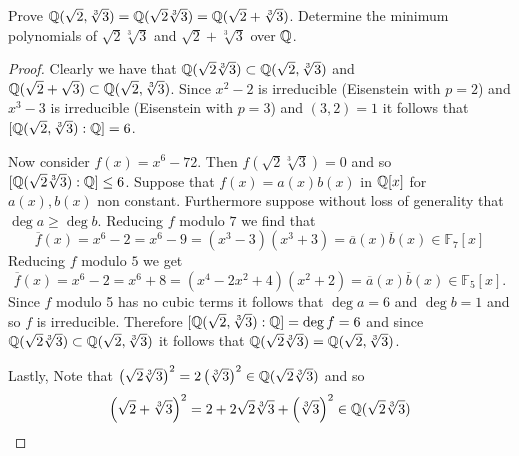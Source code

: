     \begin{ex}{21.28}
        Prove $\mathbb{Q}(\sqrt{2},\sqrt[3]{3})=\mathbb{Q}(\sqrt{2}\sqrt[3]{3})=\mathbb{Q}(\sqrt{2}+\sqrt[3]{3})$.
        Determine the minimum polynomials of $\sqrt{2}\sqrt[3]{3}$ and $\sqrt{2}+\sqrt[3]{3}$ over $\mathbb{Q}$.
    \end{ex}
    \begin{proof}
        Clearly we have that $\mathbb{Q}(\sqrt{2}\sqrt[3]{3})\subset\mathbb{Q}(\sqrt{2},\sqrt[3]{3})$ 
        and $\mathbb{Q}(\sqrt{2}+\sqrt{3})\subset\mathbb{Q}(\sqrt{2},\sqrt[3]{3})$. 
        Since $x^2-2$ is irreducible (Eisenstein with $p=2$) and $x^3-3$ is irreducible (Eisenstein with $p=3$) and $(3,2)=1$ it follows that $[\mathbb{Q}(\sqrt{2},\sqrt[3]{3}):\mathbb{Q}]=6$.

        Now consider $f(x)=x^6-72$. Then $f(\sqrt{2}\sqrt[3]{3})=0$ and so $[\mathbb{Q}(\sqrt{2}\sqrt[3]{3}):\mathbb{Q}]\leq 6$.
        Suppose that $f(x)=a(x)b(x)$ in $\mathbb{Q}[x]$ for $a(x),b(x)$ non constant. Furthermore suppose without loss of generality that $\deg a\geq \deg b$.
        Reducing $f$ modulo $7$ we find that 
        $$\overline{f}(x)=x^6-2=x^6-9=(x^3-3)(x^3+3)=\overline{a}(x)\overline{b}(x)\in\mathbb{F}_7[x]$$
        Reducing $f$ modulo $5$ we get
        $$\overline{f}(x)=x^6-2=x^6+8=(x^4-2x^2+4)(x^2+2)=\overline{a}(x)\overline{b}(x)\in\mathbb{F}_5[x].$$
        Since $f$ modulo 5 has no cubic terms it follows that $\deg a = 6$ and $\deg b = 1$ and so $f$ is irreducible. Therefore $[\mathbb{Q}(\sqrt{2},\sqrt[3]{3}):\mathbb{Q}]=\deg f=6$
        and since $\mathbb{Q}(\sqrt{2}\sqrt[3]{3})\subset\mathbb{Q}(\sqrt{2},\sqrt[3]{3})$ it follows that $\mathbb{Q}(\sqrt{2}\sqrt[3]{3})=\mathbb{Q}(\sqrt{2},\sqrt[3]{3})$. 

        Lastly, Note that $\left(\sqrt{2}\sqrt[3]{3}\right)^2=2\left(\sqrt[3]{3}\right)^2\in\mathbb{Q}(\sqrt{2}\sqrt[3]{3})$ and so
        $$\left(\sqrt{2}+\sqrt[3]{3}\right)^2=2+2\sqrt{2}\sqrt[3]{3}+\left(\sqrt[3]{3}\right)^2\in\mathbb{Q}(\sqrt{2}\sqrt[3]{3})$$
        
        
    \end{proof}

